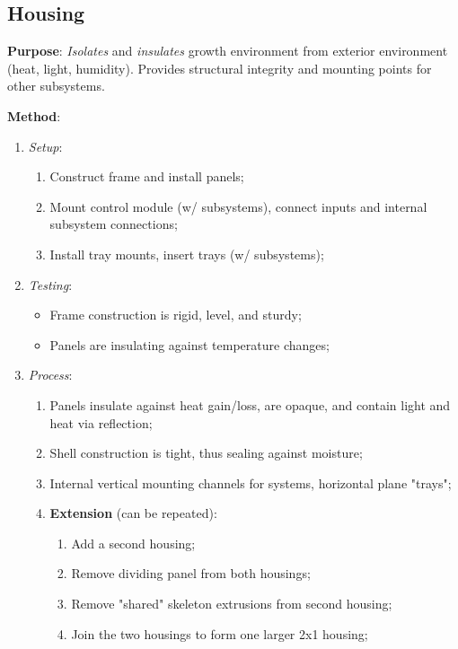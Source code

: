 \documentclass{report}
\begin{document}
\newpage

\subsection{Housing}
\label{sec:housing}

\textbf{Purpose}: \textit{Isolates} and \textit{insulates} growth environment from exterior environment (heat, light, humidity). Provides structural integrity and mounting points for other subsystems.

\textbf{Method}:
\begin{enumerate}
    \item \textit{Setup}:
    \begin{enumerate}
        \item Construct frame and install panels;
        \item Mount control module (w/ subsystems), connect inputs and internal subsystem connections;
        \item Install tray mounts, insert trays (w/ subsystems);
    \end{enumerate}
    \item \textit{Testing}:
    \begin{itemize}
        \item Frame construction is rigid, level, and sturdy;
        \item Panels are insulating against temperature changes;
    \end{itemize}
    \item \textit{Process}:
    \begin{enumerate}
        \item Panels insulate against heat gain/loss, are opaque, and contain light and heat via reflection;
        \item Shell construction is tight, thus sealing against moisture;
        \item Internal vertical mounting channels for systems, horizontal plane "trays";
        \item \textbf{Extension} (can be repeated):
        \begin{enumerate}
            \item Add a second housing;
            \item Remove dividing panel from both housings;
            \item Remove "shared" skeleton extrusions from second housing;
            \item Join the two housings to form one larger 2x1 housing;

\end{enumerate}
\end{enumerate}
\end{enumerate}
\end{document}

